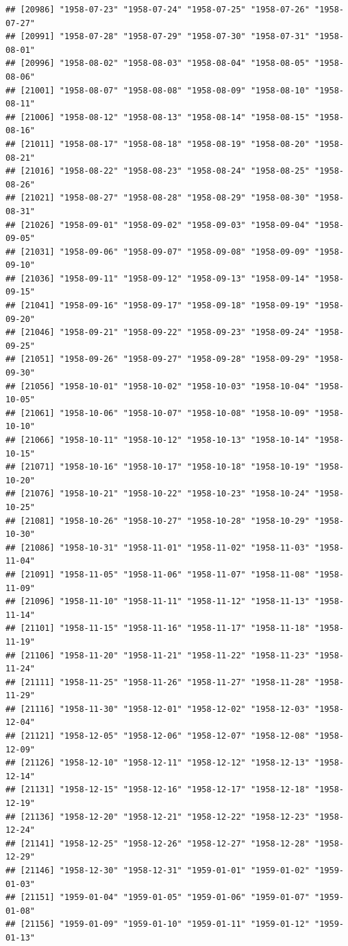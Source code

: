 \documentclass{article}\usepackage[]{graphicx}\usepackage[]{color}
\makeatletter
\newenvironment{kframe}{%
 \def\at@end@of@kframe{}%
 \ifinner\ifhmode%
  \def\at@end@of@kframe{\end{minipage}}%
  \begin{minipage}{\columnwidth}%
 \fi\fi%
 \def\FrameCommand##1{\hskip\@totalleftmargin \hskip-\fboxsep
 \colorbox{shadecolor}{##1}\hskip-\fboxsep
     \hskip-\linewidth \hskip-\@totalleftmargin \hskip\columnwidth}%
 \MakeFramed {\advance\hsize-\width
   \@totalleftmargin\z@ \linewidth\hsize
   \@setminipage}}%
 {\par\unskip\endMakeFramed%
 \at@end@of@kframe}
\newenvironment{knitrout}{}{} %
\makeatother
\begin{document}
\begin{description}
\begin{knitrout}
\begin{kframe}
\begin{verbatim}
## [20986] "1958-07-23" "1958-07-24" "1958-07-25" "1958-07-26" "1958-07-27"
## [20991] "1958-07-28" "1958-07-29" "1958-07-30" "1958-07-31" "1958-08-01"
## [20996] "1958-08-02" "1958-08-03" "1958-08-04" "1958-08-05" "1958-08-06"
## [21001] "1958-08-07" "1958-08-08" "1958-08-09" "1958-08-10" "1958-08-11"
## [21006] "1958-08-12" "1958-08-13" "1958-08-14" "1958-08-15" "1958-08-16"
## [21011] "1958-08-17" "1958-08-18" "1958-08-19" "1958-08-20" "1958-08-21"
## [21016] "1958-08-22" "1958-08-23" "1958-08-24" "1958-08-25" "1958-08-26"
## [21021] "1958-08-27" "1958-08-28" "1958-08-29" "1958-08-30" "1958-08-31"
## [21026] "1958-09-01" "1958-09-02" "1958-09-03" "1958-09-04" "1958-09-05"
## [21031] "1958-09-06" "1958-09-07" "1958-09-08" "1958-09-09" "1958-09-10"
## [21036] "1958-09-11" "1958-09-12" "1958-09-13" "1958-09-14" "1958-09-15"
## [21041] "1958-09-16" "1958-09-17" "1958-09-18" "1958-09-19" "1958-09-20"
## [21046] "1958-09-21" "1958-09-22" "1958-09-23" "1958-09-24" "1958-09-25"
## [21051] "1958-09-26" "1958-09-27" "1958-09-28" "1958-09-29" "1958-09-30"
## [21056] "1958-10-01" "1958-10-02" "1958-10-03" "1958-10-04" "1958-10-05"
## [21061] "1958-10-06" "1958-10-07" "1958-10-08" "1958-10-09" "1958-10-10"
## [21066] "1958-10-11" "1958-10-12" "1958-10-13" "1958-10-14" "1958-10-15"
## [21071] "1958-10-16" "1958-10-17" "1958-10-18" "1958-10-19" "1958-10-20"
## [21076] "1958-10-21" "1958-10-22" "1958-10-23" "1958-10-24" "1958-10-25"
## [21081] "1958-10-26" "1958-10-27" "1958-10-28" "1958-10-29" "1958-10-30"
## [21086] "1958-10-31" "1958-11-01" "1958-11-02" "1958-11-03" "1958-11-04"
## [21091] "1958-11-05" "1958-11-06" "1958-11-07" "1958-11-08" "1958-11-09"
## [21096] "1958-11-10" "1958-11-11" "1958-11-12" "1958-11-13" "1958-11-14"
## [21101] "1958-11-15" "1958-11-16" "1958-11-17" "1958-11-18" "1958-11-19"
## [21106] "1958-11-20" "1958-11-21" "1958-11-22" "1958-11-23" "1958-11-24"
## [21111] "1958-11-25" "1958-11-26" "1958-11-27" "1958-11-28" "1958-11-29"
## [21116] "1958-11-30" "1958-12-01" "1958-12-02" "1958-12-03" "1958-12-04"
## [21121] "1958-12-05" "1958-12-06" "1958-12-07" "1958-12-08" "1958-12-09"
## [21126] "1958-12-10" "1958-12-11" "1958-12-12" "1958-12-13" "1958-12-14"
## [21131] "1958-12-15" "1958-12-16" "1958-12-17" "1958-12-18" "1958-12-19"
## [21136] "1958-12-20" "1958-12-21" "1958-12-22" "1958-12-23" "1958-12-24"
## [21141] "1958-12-25" "1958-12-26" "1958-12-27" "1958-12-28" "1958-12-29"
## [21146] "1958-12-30" "1958-12-31" "1959-01-01" "1959-01-02" "1959-01-03"
## [21151] "1959-01-04" "1959-01-05" "1959-01-06" "1959-01-07" "1959-01-08"
## [21156] "1959-01-09" "1959-01-10" "1959-01-11" "1959-01-12" "1959-01-13"

\end{verbatim}
\end{kframe}
\end{knitrout}
\end{description}
\end{document}

